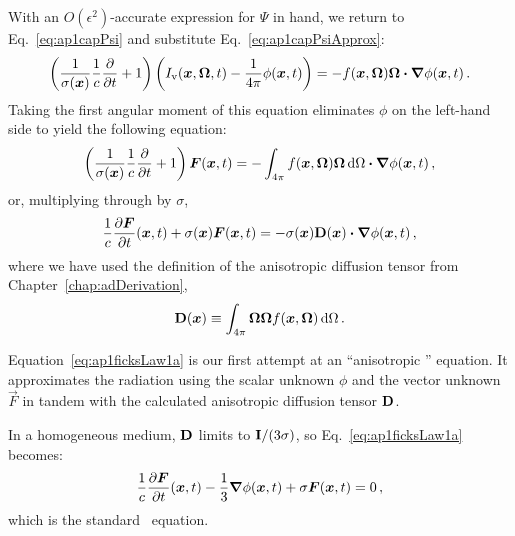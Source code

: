 With an $O(\epsilon^2)$-accurate expression for $\Psi$ in hand, we return to
Eq.~\eqref{eq:ap1capPsi} and substitute Eq.~\eqref{eq:ap1capPsiApprox}:
\begin{equation}\label{eq:ap1Interior1}
  \left( \frac{1}{\sigma(\bm{x})} \frac{1}{c}\frac{\partial }{\partial t} + 1 \right)
  \left( I_\mathrm{v}(\bm{x},\bm{\Omega},t) - \frac{1}{4\pi} \phi(\bm{x},t) \right)
  = - f(\bm{x},\bm{\Omega}) \bm{\Omega}\bm{\cdot} \bm{\nabla} \phi(\bm{x}, t) \,.
\end{equation}
Taking the first angular moment of this equation eliminates $\phi$ on the
left-hand side to yield the following equation:
\begin{equation}\label{eq:ap1ficksLaw1}
  \left( \frac{1}{\sigma(\bm{x})} \frac{1}{c}\frac{\partial }{\partial t} + 1 \right)
  \bm{F}(\bm{x},t) 
  = - \int_{4\pi} f(\bm{x},\bm{\Omega}) \bm{\Omega} \mathop{}\!\mathrm{d}\Omega
  \bm{\cdot} \bm{\nabla} \phi(\bm{x}, t) \,,
\end{equation}
or, multiplying through by $\sigma$,
\begin{equation}\label{eq:ap1ficksLaw1a}
  \frac{1}{c}\frac{\partial \bm{F}}{\partial t}(\bm{x},t) + \sigma(\bm{x})\bm{F}(\bm{x},t) 
  = - \sigma(\bm{x}) \mathbf{D}(\bm{x}) \bm{\cdot} \bm{\nabla} \phi(\bm{x}, t) \,,
\end{equation}
where we have used the definition of the anisotropic diffusion tensor from
Chapter~\ref{chap:adDerivation},
\begin{equation}\tagref{eq:dDefinition}
  \Dtens(\vec{x}) \equiv \int_{4\pi} \vec{\Omega} \vec{\Omega}
  f(\vec{x}, \vec{\Omega}) \ud\Omega \,.
\end{equation}

Equation~\eqref{eq:ap1ficksLaw1a} is our first attempt at an ``anisotropic
\Pone'' equation. It approximates the radiation using the scalar unknown $\phi$
and the vector unknown $\vec{F}$ in tandem with the calculated anisotropic
diffusion tensor $\mathbf{D}$.

In a homogeneous medium, $\mathbf{D}$ limits to $\mathbf{I}/(3\sigma)$, so
Eq.~\eqref{eq:ap1ficksLaw1a} becomes:
\begin{equation*}
  \frac{1}{c}\frac{\partial \bm{F}}{\partial t}(\bm{x},t) - \frac{1}{3} \bm{\nabla}\phi(\bm{x}, t)
  + \sigma\bm{F}(\bm{x},t) 
  = 0\,,
\end{equation*}
which is the standard \Pone\ equation.


